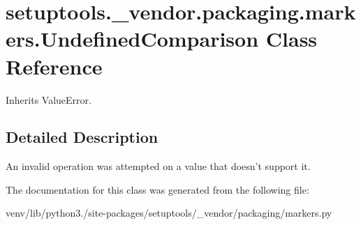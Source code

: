 \hypertarget{classsetuptools_1_1__vendor_1_1packaging_1_1markers_1_1_undefined_comparison}{}\section{setuptools.\+\_\+vendor.\+packaging.\+markers.\+Undefined\+Comparison Class Reference}
\label{classsetuptools_1_1__vendor_1_1packaging_1_1markers_1_1_undefined_comparison}


Inherits Value\+Error.



\subsection{Detailed Description}
\begin{DoxyVerb}An invalid operation was attempted on a value that doesn't support it.
\end{DoxyVerb}
 

The documentation for this class was generated from the following file\+:\begin{DoxyCompactItemize}
\item 
venv/lib/python3./site-\/packages/setuptools/\+\_\+vendor/packaging/markers.\+py\end{DoxyCompactItemize}
